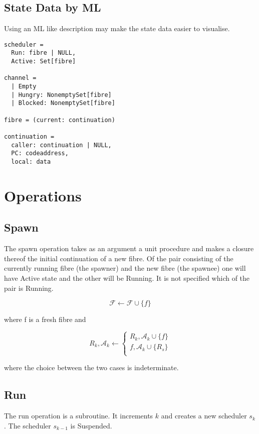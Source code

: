 \documentclass{article}
\begin{document}
\subsection{State Data by ML}
Using an ML like description may make the state data easier
to visualise.

\begin{verbatim}
scheduler =
  Run: fibre | NULL, 
  Active: Set[fibre]

channel = 
  | Empty 
  | Hungry: NonemptySet[fibre]
  | Blocked: NonemptySet[fibre]

fibre = (current: continuation)

continuation = 
  caller: continuation | NULL,
  PC: codeaddress,
  local: data
\end{verbatim}

\section{Operations}

\subsection{Spawn} 
The spawn operation takes as an argument a unit procedure and makes
a closure thereof the initial continuation
of a new fibre.  Of the pair consisting of the currently running
fibre (the spawner) and the new fibre (the spawnee) one will have Active
state and the other will be Running. It is not specified which
of the pair is Running.

\begin{equation}
{\mathcal F} \leftarrow {\mathcal F} \cup \{f\}
\end{equation}

where f is a fresh fibre and

\begin{equation}
R_k,{\mathcal A_k} \leftarrow
\begin{cases}
R_k,{\mathcal A_k} \cup \{f\} \\
f,{\mathcal A_k} \cup \{R_s\} \\
\end{cases}
\end{equation}

where the choice between the two cases is indeterminate.

\subsection{Run} 
The run operation is a subroutine. It increments $k$ and creates
a new scheduler $s_k$. The scheduler $s_{k-1}$ is Suspended. 
\end{document}
